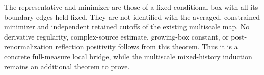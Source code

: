 The representative and minimizer are those of a fixed conditional
box with all its boundary edges held fixed. They are not identified
with the averaged, constrained minimizer and independent retained
cutoffs of the existing multiscale map. No derivative regularity,
complex-source estimate, growing-box constant, or post-renormalization
reflection positivity follows from this theorem. Thus it is a
concrete full-measure local bridge, while the multiscale mixed-history
induction remains an additional theorem to prove.
